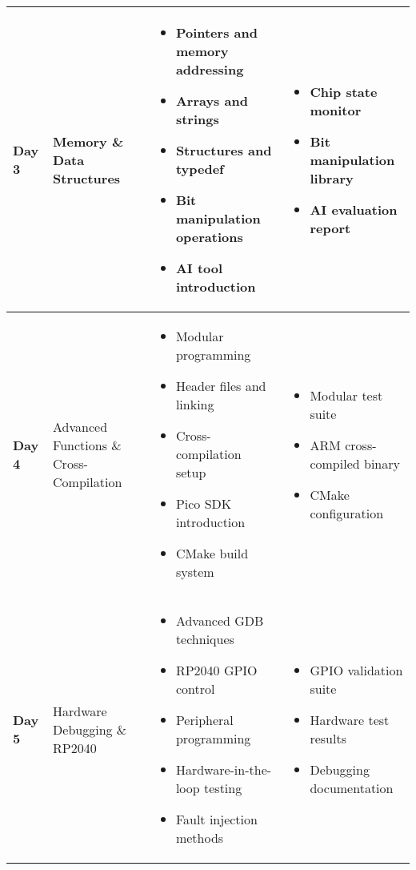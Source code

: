 \documentclass[11pt,a4paper]{article}
\begin{document}
\begin{longtable}{|p{1.5cm}|p{4cm}|p{6cm}|p{3cm}|}
\textbf{Day 3} & Memory \& Data Structures &
\begin{itemize}[nosep]
    \item Pointers and memory addressing
    \item Arrays and strings
    \item Structures and typedef
    \item Bit manipulation operations
    \item AI tool introduction
\end{itemize} &
\begin{itemize}[nosep]
    \item Chip state monitor
    \item Bit manipulation library
    \item AI evaluation report
\end{itemize} \\
\hline

\textbf{Day 4} & Advanced Functions \& Cross-Compilation &
\begin{itemize}[nosep]
    \item Modular programming
    \item Header files and linking
    \item Cross-compilation setup
    \item Pico SDK introduction
    \item CMake build system
\end{itemize} &
\begin{itemize}[nosep]
    \item Modular test suite
    \item ARM cross-compiled binary
    \item CMake configuration
\end{itemize} \\
\hline

\textbf{Day 5} & Hardware Debugging \& RP2040 &
\begin{itemize}[nosep]
    \item Advanced GDB techniques
    \item RP2040 GPIO control
    \item Peripheral programming
    \item Hardware-in-the-loop testing
    \item Fault injection methods
\end{itemize} &
\begin{itemize}[nosep]
    \item GPIO validation suite
    \item Hardware test results
    \item Debugging documentation
\end{itemize} \\
\hline


\end{longtable}
\end{document}
